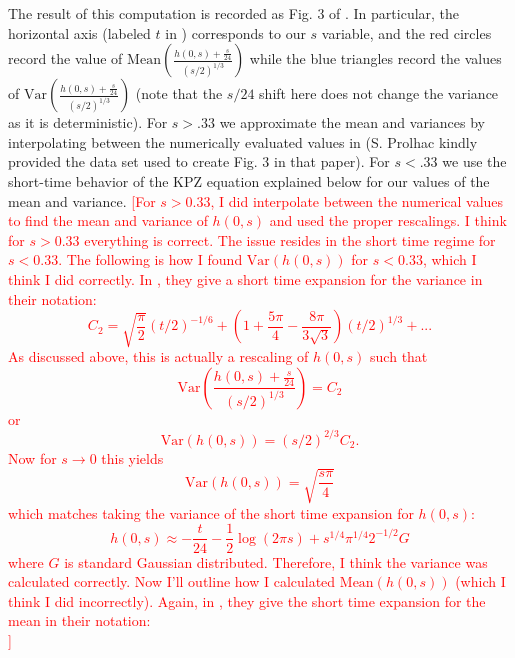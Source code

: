 \documentclass[letter,reqno, 11pt, oneside]{amsart}
\newcommand{\jh}[1]{\textcolor{red}{[#1]}}
\newcommand{\mean}[1]{\mathrm{Mean}\left(#1\right)}
\newcommand{\var}[1]{\mathrm{Var}\left(#1\right)}
\begin{document}
The result of this computation is recorded as Fig. 3 of \cite{prolhacHeightDistributionKPZ2011}. In particular, the horizontal axis (labeled $t$ in  \cite{prolhacHeightDistributionKPZ2011}) corresponds to our $s$ variable, and the red circles record the value of $\mean{\frac{h(0,s)+\frac{s}{24}}{(s/2)^{1/3}}}$ while the blue triangles record the values of $\var{\frac{h(0,s)+\frac{s}{24}}{(s/2)^{1/3}}}$ (note that the $s/24$ shift here does not change the variance as it is deterministic). For $s>.33$ we approximate the mean and variances by interpolating between the numerically evaluated values in \cite{prolhacHeightDistributionKPZ2011} (S. Prolhac kindly provided the data set used to create Fig. 3 in that paper). For $s<.33$ we use the short-time behavior of the KPZ equation explained below for our values of the mean and variance. \jh{For $s > 0.33$, I did interpolate between the numerical values to find the mean and variance of $h(0, s)$ and used the proper rescalings. I think for $s > 0.33 $ everything is correct. The issue resides in the short time regime for $s < 0.33$. The following is how I found $\var{h(0, s)}$ for $s<0.33$, which I think I did correctly. In \cite{prolhacHeightDistributionKPZ2011}, they give a short time expansion for the variance in their notation:
\begin{equation}
C_2 = \sqrt{\frac{\pi}{2}} (t/2)^{-1/6} + \left(1 + \frac{5\pi}{4} - \frac{8 \pi}{3 \sqrt{3}} \right)(t/2)^{1/3} + ...
\end{equation}As discussed above, this is actually a rescaling of $h(0,s)$ such that 
$$
\var{\frac{h(0,s)+\frac{s}{24}}{(s/2)^{1/3}}} = C_2
$$
or 
\begin{equation}
\var{h(0,s)} = (s/2)^{2/3} C_2.
\end{equation}
Now for $s\rightarrow 0$ this yields
\begin{equation}
\var{h(0, s)} = \sqrt{\frac{s\pi}{4}}
\end{equation}
which matches taking the variance of the short time expansion for $h(0,s)$:
\begin{equation}\label{eq:KPZSmallTime}
h(0,s)\approx -\frac{t}{24} -\frac{1}{2}\log(2\pi s) +s^{1/4} \pi^{1/4}2^{-1/2} G
\end{equation}
where $G$ is standard Gaussian distributed. Therefore, I think the variance was calculated correctly. 
Now I'll outline how I calculated $\mean{h(0,s)}$ (which I think I did incorrectly). Again, in \cite{prolhacHeightDistributionKPZ2011}, they give the short time expansion for the mean in their notation: 
\begin{equation}

\end{equation}}
\end{document}
